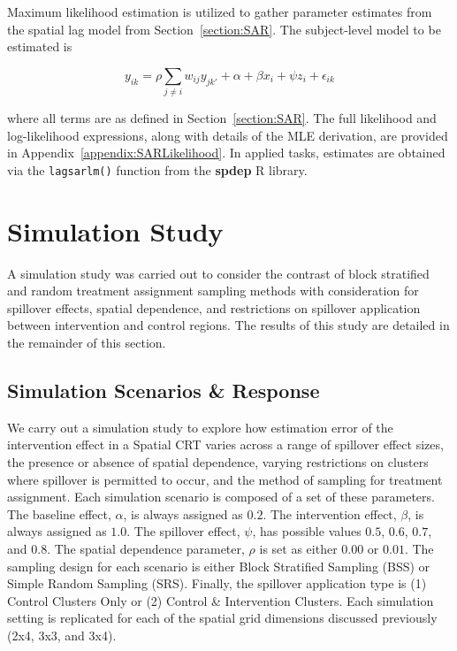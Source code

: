 \documentclass{article}[11pt]
\begin{document}
Maximum likelihood estimation is utilized to gather parameter estimates from the spatial lag model from Section~\ref{section:SAR}\cite{ord_estimation_1975}\cite{bivand_comparing_2015}\cite{bivand_computing_2013}. The subject-level model to be estimated is

\begin{equation}\label{Equation:SARestimation}
    y_{ik} = \rho \sum_{j\neq i}w_{ij}y_{jk'} + \alpha + \beta x_i + \psi z_i + \epsilon_{ik}
\end{equation}

where all terms are as defined in Section~\ref{section:SAR}. The full likelihood and log-likelihood expressions, along with details of the MLE derivation, are provided in Appendix~\ref{appendix:SARLikelihood}. In applied tasks, estimates are obtained via the \texttt{lagsarlm()} function from the \textbf{spdep} R library\cite{bivand_r_2022}.

\section{Simulation Study}\label{section:Results}

A simulation study was carried out to consider the contrast of block stratified and random treatment assignment sampling methods with consideration for spillover effects, spatial dependence, and restrictions on spillover application between intervention and control regions. The results of this study are detailed in the remainder of this section.

\subsection{Simulation Scenarios \& Response}

We carry out a simulation study to explore how estimation error of the intervention effect in a Spatial CRT varies across a range of spillover effect sizes, the presence or absence of spatial dependence, varying restrictions on clusters where spillover is permitted to occur, and the method of sampling for treatment assignment. Each simulation scenario is composed of a set of these parameters. The baseline effect, $\alpha$, is always assigned as $0.2$. The intervention effect, $\beta$, is always assigned as $1.0$. The spillover effect, $\psi$, has possible values $0.5$, $0.6$, $0.7$, and $0.8$. The spatial dependence parameter, $\rho$ is set as either $0.00$ or $0.01$. The sampling design for each scenario is either Block Stratified Sampling (BSS) or Simple Random Sampling (SRS). Finally, the spillover application type is (1) Control Clusters Only or (2) Control \& Intervention Clusters. Each simulation setting is replicated for each of the spatial grid dimensions discussed previously (2x4, 3x3, and 3x4).
\end{document}
